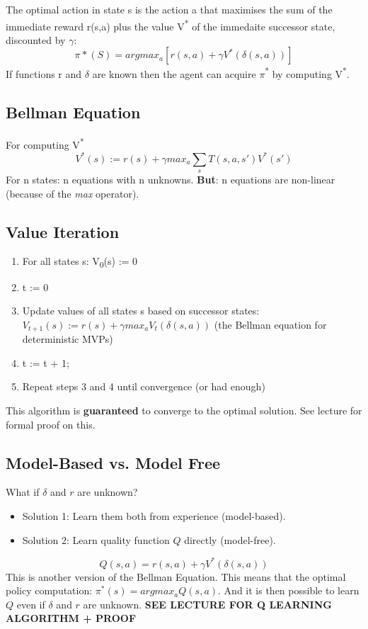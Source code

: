 \documentclass[11pt]{article}
\begin{document}
The optimal action in state s is the action a that maximises the sum of the immediate reward r(s,a) plus the value V\textsuperscript{*} of the immedaite successor state, discounted by \(\gamma\):
\begin{equation}
\pi*(S) = argmax_a[r(s,a) + \gamma V^*(\delta(s,a))]
\end{equation}
If functions r and \(\delta\) are known then the agent can acquire \(\pi\)\textsuperscript{*} by computing V\textsuperscript{*}.

\subsection{Bellman Equation}
\label{sec:org0b9e517}
For computing V\textsuperscript{*}
\begin{equation}
V^*(s) := r(s) + \gamma max_a\sum\limits_s T(s,a,s') V^*(s')
\end{equation}
For n states: n equations with n unknowns.
\textbf{But}: n equations are non-linear (because of the \emph{max} operator).

\subsection{Value Iteration}
\label{sec:orgc83d84a}
\begin{enumerate}
\item For all states s: V\textsubscript{0}(s) := 0
\item t := 0
\item Update values of all states s based on successor states: \(V_{t+1}(s) := r(s) + \gamma max_a V_t(\delta(s,a))\) (the Bellman equation for deterministic MVPs)
\item t := t + 1;
\item Repeat steps 3 and 4 until convergence (or had enough)
\end{enumerate}
This algorithm is \textbf{guaranteed} to converge to the optimal solution.
See lecture for formal proof on this.

\subsection{Model-Based vs. Model Free}
\label{sec:org603975c}
What if \(\delta\) and \(r\) are unknown?
\begin{itemize}
\item Solution 1: Learn them both from experience (model-based).
\item Solution 2: Learn quality function \(Q\) directly (model-free).
\end{itemize}
\begin{equation}
Q(s,a) = r(s,a) + \gamma V^* (\delta(s,a))
\end{equation}
This is another version of the Bellman Equation.
This means that the optimal policy computation: \(\pi^*(s) = argmax_a Q(s,a)\).
And it is then possible to learn \(Q\) even if \(\delta\) and \(r\) are unknown.
\textbf{SEE LECTURE FOR Q LEARNING ALGORITHM + PROOF}
\end{document}
